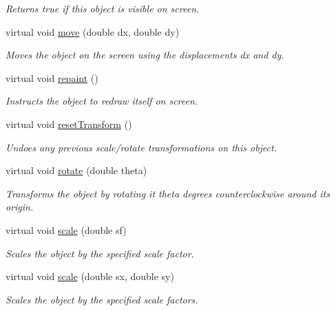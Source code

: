 \begin{DoxyCompactItemize}
\begin{DoxyCompactList}\small\item\em Returns {\ttfamily true} if this object is visible on screen. \end{DoxyCompactList}\item 
virtual void \mbox{\hyperlink{classGObject_a5973d8dda83afb36e2c56855515be392}{move}} (double dx, double dy)
\begin{DoxyCompactList}\small\item\em Moves the object on the screen using the displacements {\ttfamily dx} and {\ttfamily dy}. \end{DoxyCompactList}\item 
virtual void \mbox{\hyperlink{classGObject_ac827b978aa122f136a14c198687ad80f}{repaint}} ()
\begin{DoxyCompactList}\small\item\em Instructs the object to redraw itself on screen. \end{DoxyCompactList}\item 
virtual void \mbox{\hyperlink{classGObject_a6022a1fd1e5dcd2fd5585e5a36aa3f37}{reset\+Transform}} ()
\begin{DoxyCompactList}\small\item\em Undoes any previous scale/rotate transformations on this object. \end{DoxyCompactList}\item 
virtual void \mbox{\hyperlink{classGObject_ae1ffaa12185dfd5ba464f7d87c329e26}{rotate}} (double theta)
\begin{DoxyCompactList}\small\item\em Transforms the object by rotating it {\ttfamily theta} degrees counterclockwise around its origin. \end{DoxyCompactList}\item 
virtual void \mbox{\hyperlink{classGObject_ad2e1900f730475c2d044817db03b38d6}{scale}} (double sf)
\begin{DoxyCompactList}\small\item\em Scales the object by the specified scale factor. \end{DoxyCompactList}\item 
virtual void \mbox{\hyperlink{classGObject_a63641f69d610d0b951357d35a0c3b1e3}{scale}} (double sx, double sy)
\begin{DoxyCompactList}\small\item\em Scales the object by the specified scale factors. \end{DoxyCompactList}\item 

\end{DoxyCompactItemize}
